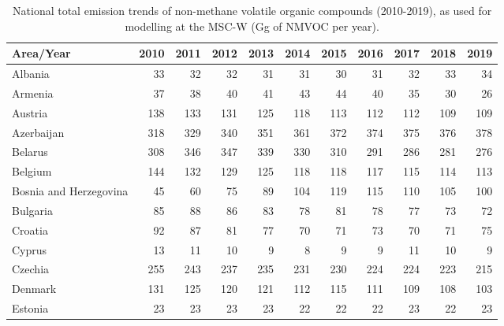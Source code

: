  \begin{table}
  \caption{National total emission trends of non-methane volatile organic compounds (2010-2019), as used for modelling at the MSC-W (Gg of NMVOC per year).}
 
 
 \vspace{15pt}
 
 \scriptsize
 \centering
 \begin{tabular}{|l|r|r|r|r|r|r|r|r|r|r|}
 \hline
                     Area/Year&   2010&   2011&   2012&   2013&   2014&   2015&   2016&   2017&   2018&   2019\\\hline\hline
                       Albania&     33&     32&     32&     31&     31&     30&     31&     32&     33&     34\\\hline
                       Armenia&     37&     38&     40&     41&     43&     44&     40&     35&     30&     26\\\hline
                       Austria&    138&    133&    131&    125&    118&    113&    112&    112&    109&    109\\\hline
                    Azerbaijan&    318&    329&    340&    351&    361&    372&    374&    375&    376&    378\\\hline
                       Belarus&    308&    346&    347&    339&    330&    310&    291&    286&    281&    276\\\hline
                       Belgium&    144&    132&    129&    125&    118&    118&    117&    115&    114&    113\\\hline
        Bosnia and Herzegovina&     45&     60&     75&     89&    104&    119&    115&    110&    105&    100\\\hline
                      Bulgaria&     85&     88&     86&     83&     78&     81&     78&     77&     73&     72\\\hline
                       Croatia&     92&     87&     81&     77&     70&     71&     73&     70&     71&     75\\\hline
                        Cyprus&     13&     11&     10&      9&      8&      9&      9&     11&     10&      9\\\hline
                       Czechia&    255&    243&    237&    235&    231&    230&    224&    224&    223&    215\\\hline
                       Denmark&    131&    125&    120&    121&    112&    115&    111&    109&    108&    103\\\hline
                       Estonia&     23&     23&     23&     23&     22&     22&     22&     23&     22&     23\\\hline

\end{tabular}
\end{table}
